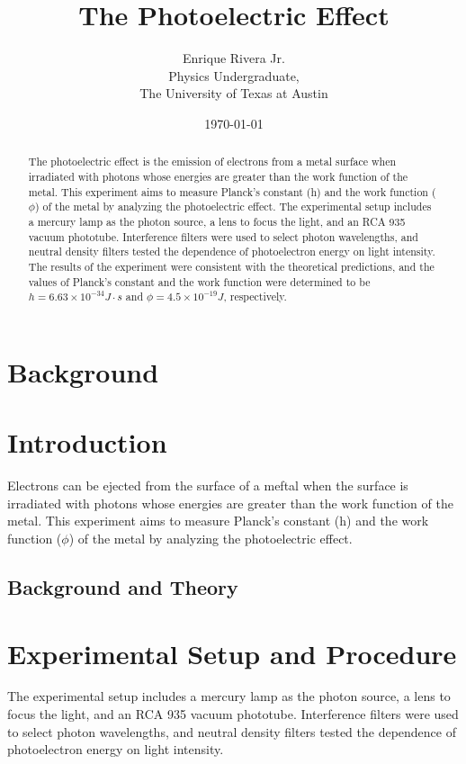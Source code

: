 \documentclass[12pt]{article}
\title{The Photoelectric Effect}
\author{Enrique Rivera Jr. \\
                Physics Undergraduate, \\ 
                The University of Texas at Austin}
\date{\today}
\begin{document}
\maketitle

\begin{abstract}
        The photoelectric effect is the emission of electrons from a metal surface when irradiated with photons 
        whose energies are greater than the work function of the metal. This experiment aims to measure Planck's 
        constant (h) and the work function ($\phi$) of the metal by analyzing the photoelectric effect. The 
        experimental setup includes a mercury lamp as the photon source, a lens to focus the light, and an 
        RCA 935 vacuum phototube. Interference filters were used to select photon wavelengths, and neutral 
        density filters tested the dependence of photoelectron energy on light intensity. The results of the 
        experiment were consistent with the theoretical predictions, and the values of Planck's constant and the 
        work function were determined to be $h = 6.63 \times 10^{-34} J \cdot s$ and $\phi = 4.5 \times 10^{-19} J$, 
        respectively.

\end{abstract}

\section{Background}

\section{Introduction}
        Electrons can be ejected from the surface of a meftal when the surface is irradiated with photons 
        whose energies are greater than the work function of the metal. This experiment aims to measure 
        Planck's constant (h) and the work function ($\phi$) of the metal by analyzing the photoelectric effect.

        \subsection{Background and Theory}



\section{Experimental Setup and Procedure}
        The experimental setup includes a mercury lamp as the photon source, a lens to focus the light, and an RCA 935 vacuum phototube. Interference filters were used to select photon wavelengths, and neutral density filters tested the dependence of photoelectron energy on light intensity.
\end{document}
